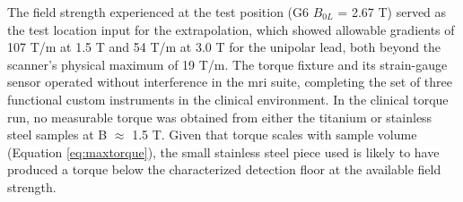  The field strength experienced at the test position (G6 $B_{0L}$ = 2.67 T) served as the test location input for the extrapolation, which showed allowable gradients of 107 T/m at 1.5 T and 54 T/m at 3.0 T for the unipolar lead, both beyond the scanner's physical maximum of 19 T/m. The torque fixture and its strain-gauge sensor operated without interference in the \gls{mri} suite, completing the set of three functional custom instruments in the clinical environment. In the clinical torque run, no measurable torque was obtained from either the titanium or stainless steel samples at B $\approx$ 1.5 T. Given that torque scales with sample volume (Equation \ref{eq:maxtorque}), the small stainless steel piece used is likely to have produced a torque below the characterized detection floor at the available field strength.
 

